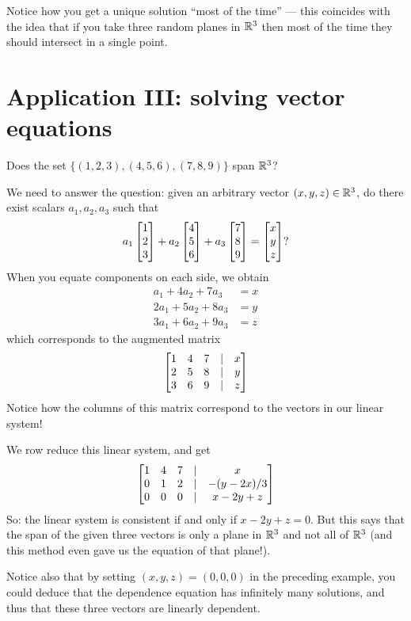 Notice how you get a unique solution ``most of the time'' --- this
coincides with the idea that if you take three random planes in
$\mathbb{R}^3$ then most of the time they should intersect in a single point.

\section{Application III:  solving vector equations}

\begin{myprob} Does the set $\{(1,2,3), (4,5,6), (7,8,9)\}$ span $\mathbb{R}^3$?

\begin{mysol} We need to answer the question:  given an arbitrary vector
$(x,y,z)\in\mathbb{R}^3$, do there exist scalars $a_1, a_2, a_3$ such
that
$$
a_1 \left[ \begin{matrix} 1\\2\\3 \end{matrix} \right] + a_2\left[ \begin{matrix} 4\\5\\6 \end{matrix} \right] + a_3 \left[ \begin{matrix} 7\\8\\9 \end{matrix} \right] = \left[ \begin{matrix} x\\y\\z \end{matrix} \right]?
$$
When you equate components on each side, we obtain
\begin{align*}
a_1 +4a_2 + 7a_3 &= x\\
2a_1+5a_2+ 8a_3 &=y\\
3a_1+6a_2 +9a_3 &= z
\end{align*}
which corresponds to the augmented matrix
$$
\left[ \begin{matrix} 1 & 4 & 7 &|& x\\
2 & 5 & 8 &|& y\\
3 & 6 & 9 &|& z \end{matrix} \right]
$$
Notice how the columns of this matrix correspond to the vectors in
our linear system!

We row reduce this linear system, and get
$$
\left[ \begin{matrix} 1 & 4 & 7 &|& x\\
0 & 1 & 2 &|& -(y-2x)/3\\
0 & 0 & 0 &|& x-2y+z
 \end{matrix} \right]
$$
So:  the linear system is consistent if and only if $x-2y+z=0$.
But this says that the span of the given three vectors is only
a plane in $\mathbb{R}^3$ and not all of $\mathbb{R}^3$ (and this method even
gave us the equation of that plane!).
\end{mysol}\end{myprob}

Notice also that by setting $(x,y,z)=(0,0,0)$ in the preceding
example, you could deduce that the dependence equation has
infinitely many solutions, and thus that these three
vectors are linearly dependent.




